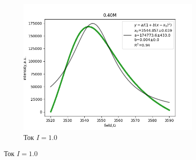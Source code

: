 \documentclass{article}
\begin{document}
\begin{figure}[h!]
\begin{subfigure}[b]{0.3\linewidth}
    \includegraphics[width=\linewidth]{2.1/23.png}
    \caption{Ток $I = 1.0$}
  \end{subfigure}
  

\end{figure}
\end{document}
